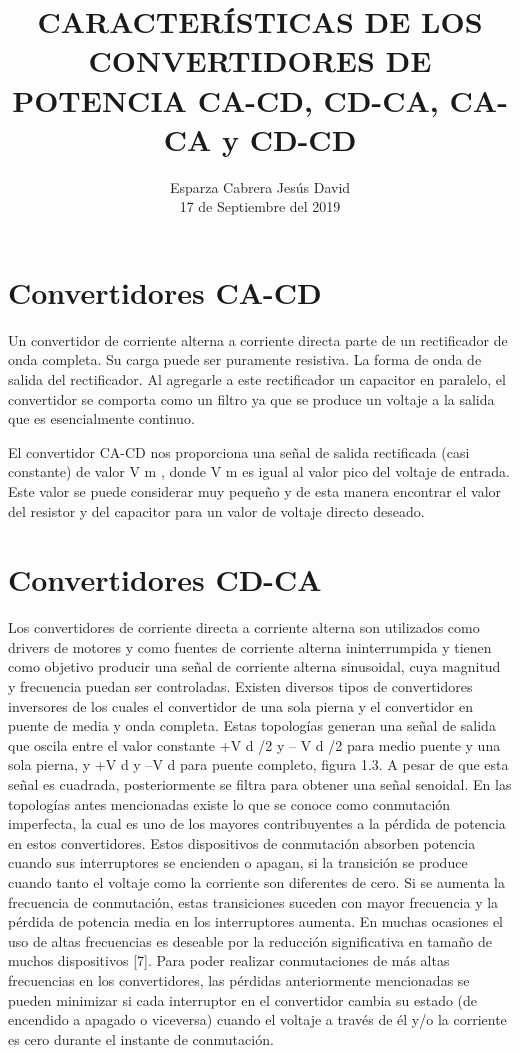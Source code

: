\documentclass[12pt]{article}
\title{\textbf{CARACTERÍSTICAS DE LOS CONVERTIDORES DE POTENCIA CA-CD, CD-CA, CA-CA y CD-CD}}
\author{Esparza Cabrera Jesús David\\
		17 de Septiembre del 2019\\}
\date{}
\begin{document}
\maketitle

\section{Convertidores CA-CD}

Un convertidor de corriente alterna a corriente directa parte de un rectificador de
onda completa. Su carga puede ser puramente resistiva. La forma de onda de
salida del rectificador. Al agregarle a este rectificador un
capacitor en paralelo, el convertidor se comporta como un
filtro ya que se produce un voltaje a la salida que es esencialmente continuo. 

El convertidor CA-CD nos proporciona una señal de salida rectificada (casi
constante) de valor V m , donde V m es igual al valor pico del voltaje de entrada.
Este
valor se puede considerar muy pequeño y de esta manera encontrar el valor del resistor y
del capacitor para un valor de voltaje directo deseado.

\section{Convertidores CD-CA}
Los convertidores de corriente directa a corriente alterna son utilizados como
drivers de motores y como fuentes de corriente alterna ininterrumpida y tienen como
objetivo producir una señal de corriente alterna sinusoidal, cuya magnitud y frecuencia
puedan ser controladas. Existen diversos tipos de convertidores inversores de los
cuales el convertidor de una sola pierna y el convertidor en puente de media y onda
completa.
Estas topologías generan una señal de salida que oscila entre el valor constante +V d /2 y –
V d /2 para medio puente y una sola pierna, y +V d y –V d para puente completo, figura 1.3. A
pesar de que esta señal es cuadrada, posteriormente se filtra para obtener una señal
senoidal.
En las topologías antes mencionadas existe lo que se conoce como conmutación
imperfecta, la cual es uno de los mayores contribuyentes a la pérdida de potencia en estos
convertidores. Estos dispositivos de conmutación absorben potencia cuando sus
interruptores se encienden o apagan, si la transición se produce cuando tanto el voltaje
como la corriente son diferentes de cero. Si se aumenta la frecuencia de conmutación, estas
transiciones suceden con mayor frecuencia y la pérdida de potencia media en los interruptores aumenta. En muchas ocasiones el uso de altas frecuencias es deseable por la
reducción significativa en tamaño de muchos dispositivos [7].
Para poder realizar conmutaciones de más altas frecuencias en los convertidores, las
pérdidas anteriormente mencionadas se pueden minimizar si cada interruptor en el
convertidor cambia su estado (de encendido a apagado o viceversa) cuando el voltaje a
través de él y/o la corriente es cero durante el instante de conmutación.
\end{document}
